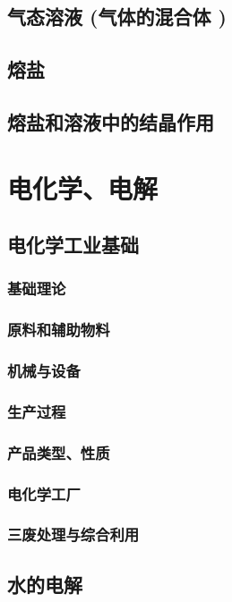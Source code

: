 \documentclass[UTF8]{../03-Chemistry}
\begin{document}
\section{气态溶液 (气体的混合体 )}
\section{熔盐}
\section{熔盐和溶液中的结晶作用}







\chapter{电化学、电解}
\section{电化学工业基础}
    \subsection{基础理论}
    \subsection{原料和辅助物料}
    \subsection{机械与设备}
    \subsection{生产过程}
    \subsection{产品类型、性质}
    \subsection{电化学工厂}
    \subsection{三废处理与综合利用}






\section{水的电解}
\end{document}
